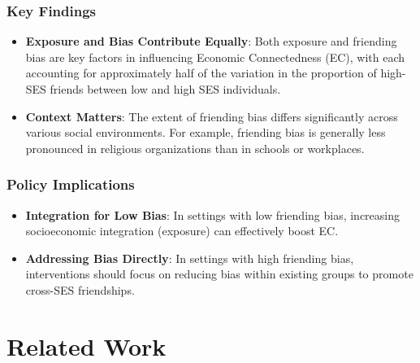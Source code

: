 \documentclass[9 pt]{article} %
\begin{document}
\subsubsection*{Key Findings}
\begin{itemize}
    \item \textbf{Exposure and Bias Contribute Equally}: Both exposure and friending bias are key factors in influencing Economic Connectedness (EC), with each accounting for approximately half of the variation in the proportion of high-SES friends between low and high SES individuals.
    \item \textbf{Context Matters}: The extent of friending bias differs significantly across various social environments. For example, friending bias is generally less pronounced in religious organizations than in schools or workplaces.
\end{itemize}

\subsubsection*{Policy Implications}
\begin{itemize}
    \item \textbf{Integration for Low Bias}: In settings with low friending bias, increasing socioeconomic integration (exposure) can effectively boost EC.
    \item \textbf{Addressing Bias Directly}: In settings with high friending bias, interventions should focus on reducing bias within existing groups to promote cross-SES friendships.
\end{itemize}

\section{Related Work}
\end{document}
